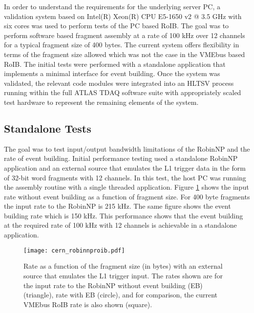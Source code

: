 In order to understand the requirements for the underlying server PC, a validation system based on Intel(R) Xeon(R) CPU E5-1650 v2 
@ 3.5 GHz with six cores was used to perform tests of the PC based RoIB. 
The goal was to perform software based fragment assembly at a rate of 100 kHz over 12 channels for a typical 
fragment size of 400 bytes. The current system offers flexibility in terms of the fragment size allowed which was not the case in the 
VMEbus based RoIB. The initial tests were performed with a standalone application that implements a minimal interface for event building. 
Once the system was validated, the relevant code modules were integrated into an HLTSV process running within the full ATLAS TDAQ 
software suite with appropriately scaled test hardware to represent the remaining elements of the system.

\subsection{Standalone Tests}\label{sec:perf_alone}

The goal was to test input/output bandwidth limitations of the RobinNP and the rate of event building. Initial performance testing used 
a standalone RobinNP application and an external source that emulates the L1 trigger data 
in the form of 32-bit word fragments with 12 channels. In this test, the host PC was running the assembly routine with a single threaded application.  Figure \ref{fig:roib_proto} shows the input rate without 
event building as a function of fragment size. For 400 byte fragments the input rate to the RobinNP is 215 kHz. 
The same figure 
shows the event building rate which is 150 kHz. This performance shows that the event building 
at the required rate of 100 kHz with 12 channels is achievable in a standalone application.  


 \begin{figure}[tbp] %
   \centering
   \texttt{[image: cern\_robinnproib.pdf]}
   \caption{Rate as a function of the fragment size (in bytes) with an external source that emulates the L1 trigger input. 
     The rates shown are for the input rate to the RobinNP without event building (EB) (triangle), rate with EB (circle), and 
     for comparison, the current VMEbus RoIB rate is also shown (square).  }
   \label{fig:roib_proto}
 \end{figure}



